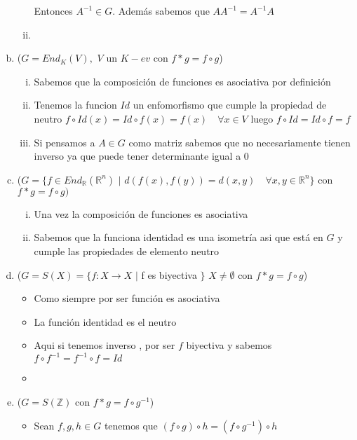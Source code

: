 \documentclass[12pt]{article}
\newcommand{\R}{\mathbb{R}}
\newcommand{\Z}{\mathbb{Z}}
\newcommand{\ra}{\rightarrow}
\theoremstyle{definition}
\begin{document}
\begin{enumerate}[(a)]
\begin{enumerate}[i.]
	Entonces $A^{-1} \in G$. Además sabemos que $AA^{-1} = A^{-1}A $

      \item 
   \end{enumerate}

   \newpage
 \item ($G = End_{K}(V),$  $V$ un $ K-ev$ con $f*g =f \circ g$)

   \begin{enumerate}[i.]
  \item Sabemos que la composición de funciones es asociativa por definición
  \item Tenemos la funcion $Id$ un enfomorfismo que cumple la propiedad de neutro $f \circ Id (x) = Id \circ f(x) = f(x) \quad \forall x \in V$ luego $f \circ Id = Id \circ f = f$
  \item Si pensamos a $A \in G$ como matriz sabemos que no necesariamente tienen inverso ya que puede tener determinante igual a 0 
\end{enumerate}

 \item ($G = \{f \in End_{\R}(\R^n)$  $|$ $ d(f(x),f(y)) = d(x,y) \quad \forall x,y \in \R^n\}$ con $f*g = f \circ g)$
   \begin{enumerate}[i.]
     \item Una vez la composición de funciones es asociativa 
     \item Sabemos que la funciona identidad es una isometría asi que está en $G$ y cumple las propiedades de elemento neutro


   \end{enumerate}

 \item ($G = S(X) = \{f: X \ra X $ $|$ f es biyectiva $\}$ $X \neq \emptyset$ con $ f*g = f \circ g $)
   \begin{itemize}
     \item Como siempre por ser función es asociativa
     \item La función identidad es el neutro 
     \item Aqui si tenemos inverso , por ser $f$ biyectiva y sabemos $f \circ f^{-1} = f^{-1} \circ f = Id$
     \item 
    \end{itemize}
 \item ($G = S(\Z)$ con $f*g = f \circ g^{-1}$) 
   \begin{itemize}
     \item Sean $f,g,h \in G$ tenemos que $(f \circ g ) \circ h = (f \circ g^{-1} ) \circ h$
   \end{itemize}
\end{enumerate}
\end{document}
